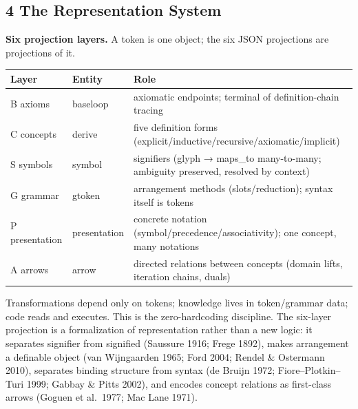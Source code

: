 \documentclass[
]{article}
\begin{document}
\subsection{4 The Representation
System}\label{the-representation-system}

\textbf{Six projection layers.} A token is one object; the six JSON
projections are projections of it.

\begin{longtable}[]{@{}
  >{\raggedright\arraybackslash}p{}
  >{\raggedright\arraybackslash}p{}
  >{\raggedright\arraybackslash}p{}@{}}
\toprule\noalign{}
\begin{minipage}[b]{\linewidth}\raggedright
Layer
\end{minipage} & \begin{minipage}[b]{\linewidth}\raggedright
Entity
\end{minipage} & \begin{minipage}[b]{\linewidth}\raggedright
Role
\end{minipage} \\
\midrule\noalign{}
\endhead
\bottomrule\noalign{}
\endlastfoot
B axioms & baseloop & axiomatic endpoints; terminal of definition-chain
tracing \\
C concepts & derive & five definition forms
(explicit/inductive/recursive/axiomatic/implicit) \\
S symbols & symbol & signifiers (glyph → maps\_to many-to-many;
ambiguity preserved, resolved by context) \\
G grammar & gtoken & arrangement methods (slots/reduction); syntax
itself is tokens \\
P presentation & presentation & concrete notation
(symbol/precedence/associativity); one concept, many notations \\
A arrows & arrow & directed relations between concepts (domain lifts,
iteration chains, duals) \\
\end{longtable}

Transformations depend only on tokens; knowledge lives in token/grammar
data; code reads and executes. This is the zero-hardcoding discipline.
The six-layer projection is a formalization of representation rather
than a new logic: it separates signifier from signified (Saussure 1916;
Frege 1892), makes arrangement a definable object (van Wijngaarden 1965;
Ford 2004; Rendel \& Ostermann 2010), separates binding structure from
syntax (de Bruijn 1972; Fiore--Plotkin--Turi 1999; Gabbay \& Pitts
2002), and encodes concept relations as first-class arrows (Goguen et
al.~1977; Mac Lane 1971).
\end{document}
